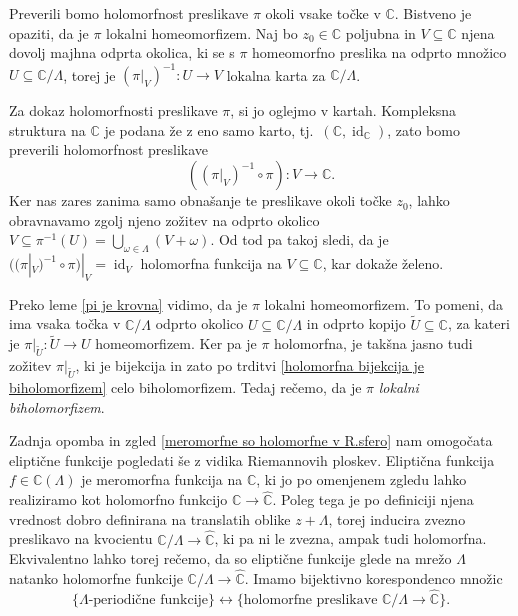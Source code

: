 \documentclass[mat1]{fmfdelo}
\numberwithin{equation}{section}
\newcommand{\C}{\mathbb C}
\newcommand{\RS}{\widehat{\C}}
\newcommand{\om}{\omega}
\newcommand{\inv}{^{-1}}
\newcommand{\torus}{\C/\Lambda}
\newcommand{\tj}{tj.\ }
\DeclareMathOperator{\id}{id}
\theoremstyle{definition}
\begin{document}
\begin{dokaz}
    Preverili bomo holomorfnost preslikave $\pi$ okoli vsake točke v $\C$. Bistveno je opaziti, da je $\pi$ lokalni homeomorfizem. Naj bo $z_0 \in \C$ poljubna in $V \subseteq \C$ njena dovolj majhna odprta okolica, ki se s $\pi$ homeomorfno preslika na odprto množico $U \subseteq \torus$, torej je $(\pi|_{V})\inv : U \to V$ lokalna karta za $\torus$. 

    Za dokaz holomorfnosti preslikave $\pi$, si jo oglejmo v kartah. Kompleksna struktura na $\C$ je podana že z eno samo karto, \tj $(\C, \id_\C)$, zato bomo preverili holomorfnost preslikave
    \[
        ((\pi|_{V})\inv \circ \pi) : V \to \C.
    \]
    Ker nas zares zanima samo obnašanje te preslikave okoli točke $z_0$, lahko obravnavamo zgolj njeno zožitev na odprto okolico $V \subseteq \pi\inv(U) = \bigcup_{\om \in \Lambda} (V + \om)$. Od tod pa takoj sledi, da je $((\pi|_V)\inv \circ \pi)|_V = \id_V$ holomorfna funkcija na $V \subseteq \C$, kar dokaže želeno. 
\end{dokaz}

\begin{opomba}
    Preko leme \ref{pi je krovna} vidimo, da je $\pi$ lokalni homeomorfizem. To pomeni, da ima vsaka točka v $\torus$ odprto okolico $U\subseteq \torus$ in odprto kopijo $\tilde{U} \subseteq \C$, za kateri je $\pi|_{\tilde{U}} : \tilde{U} \to U$ homeomorfizem. Ker pa je $\pi$ holomorfna, je takšna jasno tudi zožitev $\pi|_{\tilde{U}}$, ki je bijekcija in zato po trditvi \ref{holomorfna bijekcija je biholomorfizem} celo biholomorfizem. Tedaj rečemo, da je $\pi$ \emph{lokalni biholomorfizem}.
\end{opomba}




Zadnja opomba in zgled \ref{meromorfne so holomorfne v R.sfero} nam omogočata eliptične funkcije pogledati še z vidika Riemannovih ploskev. Eliptična funkcija $f \in \C(\Lambda)$ je meromorfna funkcija na $\C$, ki jo po omenjenem zgledu lahko realiziramo kot holomorfno funkcijo $\C \to \RS$. Poleg tega je po definiciji njena vrednost dobro definirana na translatih oblike $z + \Lambda$, torej inducira zvezno preslikavo na kvocientu $\torus \to \RS$, ki pa ni le zvezna, ampak tudi holomorfna.  Ekvivalentno lahko torej rečemo, da so eliptične funkcije glede na mrežo $\Lambda$ natanko holomorfne funkcije $\torus \to \RS$. Imamo bijektivno korespondenco množic
\[
    \{\text{$\Lambda$-periodične funkcije}\} \longleftrightarrow \{\text{holomorfne preslikave } \torus \to \RS\}.
\]
\end{document}
